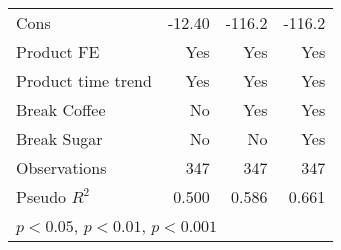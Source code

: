 \begin{table}[htbp]
\begin{tabular}{l*{3}{D{.}{.}{-1}}}
Cons                &      -12.40         &      -116.2\sym{***}&      -116.2\sym{***}\\
Product FE          &         Yes         &         Yes         &         Yes         \\
Product time trend  &         Yes         &         Yes         &         Yes         \\
Break Coffee        &          No         &         Yes         &         Yes         \\
Break Sugar         &          No         &          No         &         Yes         \\
\hline
Observations        &         347         &         347         &         347         \\
Pseudo \(R^{2}\)    &       0.500         &       0.586         &       0.661         \\
\hline\hline
{}\\
\end{tabular}
\end{table}

